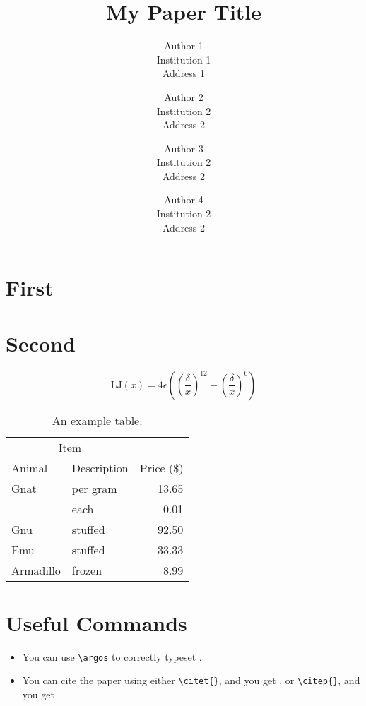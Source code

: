 \documentclass{nestpaper}
\title{My Paper Title}
\author{
  Author 1\\
  Institution 1 \\
  Address 1 \\
  \email{author1@institution1.edu}
  \and
  Author 2\\
  Institution 2 \\
  Address 2 \\
  \email{author2@institution2.edu}
  \and
  Author 3\\
  Institution 2 \\
  Address 2 \\
  \email{author2@institution2.edu}
  \and
  Author 4\\
  Institution 2 \\
  Address 2 \\
  \email{author2@institution2.edu}}
\begin{document}

\maketitle

\begin{abstract}
\lipsum[1]
\end{abstract}

\section{First}
\lipsum[1-6]

\section{Second}
\lipsum[9]
\begin{equation}
  \text{LJ}(x) = 4\epsilon\left(\left(\frac{\delta}{x}\right)^{12} - \left(\frac{\delta}{x}\right)^6\right)
\end{equation}

\lipsum[10]

\begin{table}[t]
  \centering
  \caption{An example table.}
  \begin{tabular}{@{}llr@{}}
    \toprule
    \multicolumn{2}{c}{Item} \\
    \cmidrule(r){1-2}
    Animal    & Description & Price (\$)\\
    \midrule
    Gnat      & per gram    & 13.65     \\
              & each        & 0.01      \\
    Gnu       & stuffed     & 92.50     \\
    Emu       & stuffed     & 33.33     \\
    Armadillo & frozen      & 8.99      \\
    \bottomrule
  \end{tabular}
\end{table}

\section{Useful Commands}
\begin{itemize}
\item You can use \verb|\argos| to correctly typeset \argos.
\item You can cite the paper using either \verb|\citet{}|, and you get \citet{Pinciroli:SI2012}, or \verb|\citep{}|, and you get \citep{Pinciroli:SI2012}.
\end{itemize}

%
%


\end{document}
